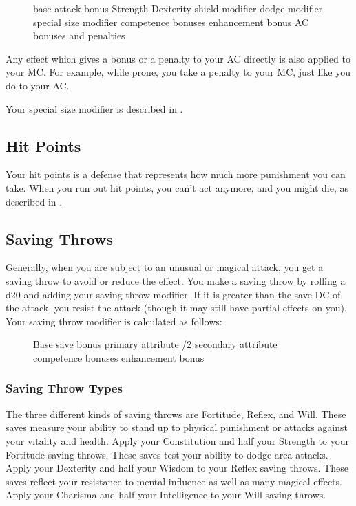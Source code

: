 \begin{figure}[h]
     \add base attack bonus \add Strength \add Dexterity \add shield modifier \add dodge modifier \add special size modifier \add competence bonuses \add enhancement bonus \add AC bonuses and penalties
\end{figure}

Any effect which gives a bonus or a penalty to your AC directly is also applied to your MC. For example, while prone, you take a  penalty to your MC, just like you do to your AC. 

Your special size modifier is described in .

\subsection{Hit Points}
Your hit points is a defense that represents how much more punishment you can take. When you run out hit points, you can't act anymore, and you might die, as described in .

\subsection{Saving Throws}
Generally, when you are subject to an unusual or magical attack, you get a saving throw to avoid or reduce the effect. You make a saving throw by rolling a d20 and adding your saving throw modifier. If it is greater than the save DC of the attack, you resist the attack (though it may still have partial effects on you). Your saving throw modifier is calculated as follows:

\begin{figure}[h]
\centering Base save bonus \add primary attribute /2 secondary attribute \add competence bonuses \add enhancement bonus
\end{figure}

\subsubsection{Saving Throw Types}
The three different kinds of saving throws are Fortitude, Reflex, and Will.
 These saves measure your ability to stand up to physical punishment or attacks against your vitality and health. Apply your Constitution and half your Strength to your Fortitude saving throws.
 These saves test your ability to dodge area attacks. Apply your Dexterity and half your Wisdom to your Reflex saving throws.
 These saves reflect your resistance to mental influence as well as many magical effects. Apply your Charisma and half your Intelligence to your Will saving throws.


